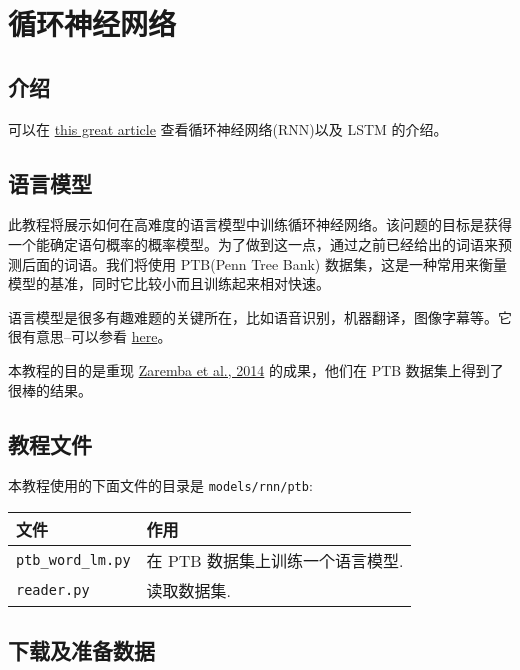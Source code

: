 

\section{循环神经网络 }\label{ux5faaux73afux795eux7ecfux7f51ux7edc}

\subsection{介绍 }\label{ux4ecbux7ecd}

可以在
\href{http://colah.github.io/posts/2015-08-Understanding-LSTMs/}{this
great article} 查看循环神经网络(RNN)以及 LSTM 的介绍。

\subsection{语言模型 }\label{ux8bedux8a00ux6a21ux578b}

此教程将展示如何在高难度的语言模型中训练循环神经网络。该问题的目标是获得一个能确定语句概率的概率模型。为了做到这一点，通过之前已经给出的词语来预测后面的词语。我们将使用
PTB(Penn Tree Bank)
数据集，这是一种常用来衡量模型的基准，同时它比较小而且训练起来相对快速。

语言模型是很多有趣难题的关键所在，比如语音识别，机器翻译，图像字幕等。它很有意思--可以参看
\href{http://karpathy.github.io/2015/05/21/rnn-effectiveness/}{here}。

本教程的目的是重现 \href{http://arxiv.org/abs/1409.2329}{Zaremba et al.,
2014} 的成果，他们在 PTB 数据集上得到了很棒的结果。

\subsection{教程文件 }\label{ux6559ux7a0bux6587ux4ef6}

本教程使用的下面文件的目录是 \texttt{models/rnn/ptb}:

\begin{longtable}[c]{@{}ll@{}}
\toprule
文件 & 作用\tabularnewline
\midrule
\endhead
\texttt{ptb\_word\_lm.py} & 在 PTB
数据集上训练一个语言模型.\tabularnewline
\texttt{reader.py} & 读取数据集.\tabularnewline
\bottomrule
\end{longtable}

\subsection{下载及准备数据
}\label{ux4e0bux8f7dux53caux51c6ux5907ux6570ux636e}

